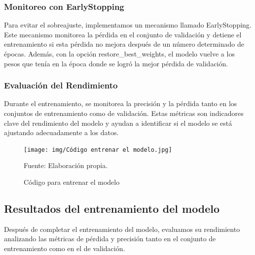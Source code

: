 \subsubsection{Monitoreo con EarlyStopping} 
Para evitar el sobreajuste, implementamos un mecanismo llamado EarlyStopping. Este mecanismo monitorea la pérdida en el conjunto de validación y detiene el entrenamiento si esta pérdida no mejora después de un número determinado de épocas. Además, con la opción restore\_best\_weights, el modelo vuelve a los pesos que tenía en la época donde se logró la mejor pérdida de validación.

\subsubsection{Evaluación del Rendimiento} 
Durante el entrenamiento, se monitorea la precisión y la pérdida tanto en los conjuntos de entrenamiento como de validación. Estas métricas son indicadores clave del rendimiento del modelo y ayudan a identificar si el modelo se está ajustando adecuadamente a los datos.

\begin{figure}[H]
    \begin{minipage}[t]{0.9\textwidth}
        \caption{Código para entrenar el modelo}
        \label{entrenar_modelo}        
    \end{minipage}

    \vspace{10pt}

    \begin{minipage}[b]{1\textwidth}
        \centering
        \texttt{[image: img/Código entrenar el modelo.jpg]}        
    \end{minipage}

    \begin{minipage}[t]{0.9\textwidth}
        Fuente: Elaboración propia.
    \end{minipage}
\end{figure}


\subsection{Resultados del entrenamiento del modelo}

Después de completar el entrenamiento del modelo, evaluamos su rendimiento analizando las métricas de pérdida y precisión tanto en el conjunto de entrenamiento como en el de validación.

